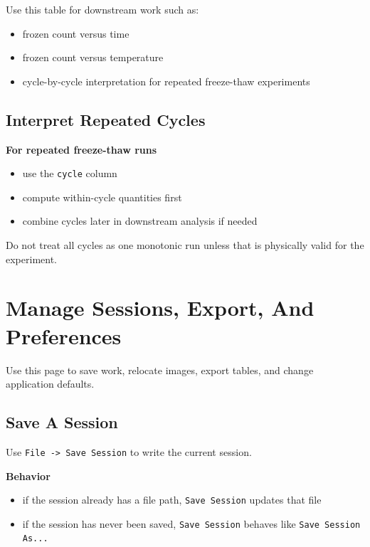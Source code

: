 \documentclass[
  9pt,
  letterpaper,
  oneside,
  open=any,
  DIV=15,
  parskip=half-,
  headings=big,
  numbers=noenddot
]{scrbook}
\newcommand{\manuallead}[1]{%
  \vspace{0.15em}%
  {\sffamily\bfseries\color{ManualBlue}#1}\par\nobreak\vspace{0.05em}%
}
\begin{document}
Use this table for downstream work such as:


\begin{itemize}[leftmargin=*,itemsep=0.35em,topsep=0.4em]
\item frozen count versus time
\item frozen count versus temperature
\item cycle-by-cycle interpretation for repeated freeze-thaw experiments
\end{itemize}

\section{Interpret Repeated Cycles}

\manuallead{For repeated freeze-thaw runs}

\begin{itemize}[leftmargin=*,itemsep=0.35em,topsep=0.4em]
\item use the \texttt{cycle} column
\item compute within-cycle quantities first
\item combine cycles later in downstream analysis if needed
\end{itemize}

Do not treat all cycles as one monotonic run unless that is physically valid for the experiment.


\chapter{Manage Sessions, Export, And Preferences}

Use this page to save work, relocate images, export tables, and change application defaults.


\section{Save A Session}

Use \texttt{File -> Save Session} to write the current session.


\manuallead{Behavior}

\begin{itemize}[leftmargin=*,itemsep=0.35em,topsep=0.4em]
\item if the session already has a file path, \texttt{Save Session} updates that file
\item if the session has never been saved, \texttt{Save Session} behaves like \texttt{Save Session As...}
\end{itemize}
\end{document}
